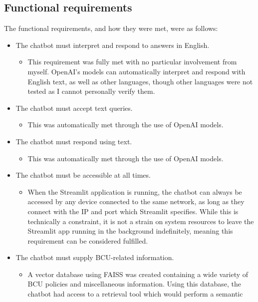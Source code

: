 \subsection{Functional requirements} 
The functional requirements, and how they were met, were as follows:

\begin{itemize}
    \item The chatbot must interpret and respond to answers in English.
    \begin{itemize}
        \item This requirement was fully met with no particular involvement from myself. OpenAI's models can automatically 
        interpret and respond with English text, as well as other languages, though other languages were not tested as I 
        cannot personally verify them. 
    \end{itemize}
    \item The chatbot must accept text queries.
    \begin{itemize}
        \item This was automatically met through the use of OpenAI models.
    \end{itemize}
    \item The chatbot must respond using text.
    \begin{itemize}
        \item This was automatically met through the use of OpenAI models.
    \end{itemize}
    \item The chatbot must be accessible at all times.
    \begin{itemize}
        \item When the Streamlit application is running, the chatbot can always be accessed 
        by any device connected to the same network, as long as they connect with the IP and port
        which Streamlit specifies. While this is technically a constraint, it is not a strain on 
        system resources to leave the Streamlit app running in the background indefinitely, meaning this 
        requirement can be considered fulfilled.
    \end{itemize}
    \item The chatbot must supply BCU-related information.
    \begin{itemize}
        \item A vector database using FAISS was created containing a wide variety of BCU policies and miscellaneous
        information. Using this database, the chatbot had access to a retrieval tool which would perform a semantic 

\end{itemize}
\end{itemize}
